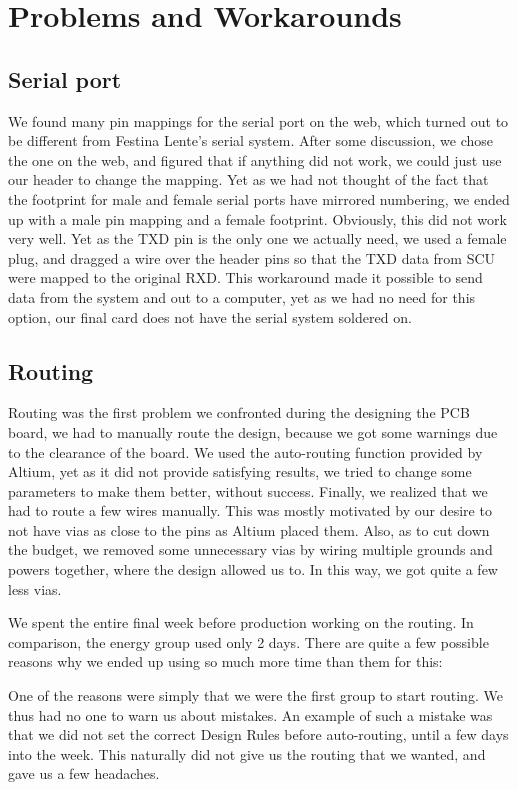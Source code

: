 \section {Problems and Workarounds}
\subsection{Serial port}
We found many pin mappings for the serial port on the web, which turned out to
be different from Festina Lente's serial system. After some discussion, we chose
the one on the web, and figured that if anything did not work, we could just
use our header to change the mapping.  Yet as we had not thought of the fact
that the footprint for male and female serial ports have mirrored numbering,
we ended up with a male pin mapping and a female footprint.  Obviously,
this did not work very well. Yet as the TXD pin is the only one we actually
need, we used a female plug, and dragged a wire over the header pins so that
the TXD data from SCU were mapped to the original RXD. This workaround made it
possible to send data from the system and out to a computer, yet as we had no
need for this option, our final card does not have the serial system soldered on.

\subsection{Routing}
Routing was the first problem we confronted during the designing the \ac{PCB}
board, we had to manually route the design, because we got some warnings due to
the clearance of the board. We used the auto-routing function provided by
Altium, yet as it did not provide satisfying results, we tried to change some
parameters to make them better, without success. Finally, we realized that we
had to route a few wires manually. This was mostly motivated by our desire to
not have vias as close to the pins as Altium placed them. Also, as to cut down
the budget, we removed some unnecessary vias by wiring multiple grounds and
powers together, where the design allowed us to. In this way, we got quite a few
less vias.

We spent the entire final week before production working on the routing. In comparison, the energy group used only 2 days. There are quite a few possible reasons why we ended up using so much more time than them for this:

One of the reasons were simply that we were the first group to start routing. We thus had no one to warn us about mistakes. An example of such a mistake was that we did not set the correct Design Rules before auto-routing, until a few days into the week. This naturally did not give us the routing that we wanted, and gave us a few headaches.

